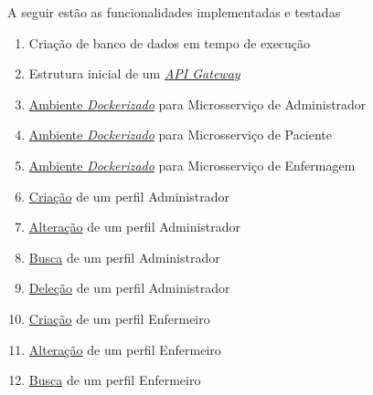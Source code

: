 \begin{apendicesenv}
A seguir estão as funcionalidades implementadas e testadas

\begin{enumerate}
    \item Criação de banco de dados em tempo de execução
    \item Estrutura inicial de um \href{https://github.com/PillWatcher/pillwatcher-api-gateway}{\emph{API Gateway}}
    \item \href{https://github.com/PillWatcher/pillwatcher-dpb-admin-service/blob/master/Dockerfile}{Ambiente \emph{Dockerizado}} para Microsserviço de Administrador
    \item \href{https://github.com/PillWatcher/pillwatcher-dpb-patient-service/blob/master/Dockerfile}{Ambiente \emph{Dockerizado}} para Microsserviço de Paciente
    \item \href{https://github.com/PillWatcher/pillwatcher-dpb-nursing-service/blob/master/Dockerfile}{Ambiente \emph{Dockerizado}} para Microsserviço de Enfermagem
    \item \href{https://github.com/PillWatcher/pillwatcher-dpb-admin-service/blob/master/src/main/java/br/com/pillwatcher/dpb/services/impl/AdminServiceImpl.java#L32}{Criação} de um perfil Administrador
    \item \href{https://github.com/PillWatcher/pillwatcher-dpb-admin-service/blob/master/src/main/java/br/com/pillwatcher/dpb/services/impl/AdminServiceImpl.java#L50}{Alteração} de um perfil Administrador
    \item \href{https://github.com/PillWatcher/pillwatcher-dpb-admin-service/blob/master/src/main/java/br/com/pillwatcher/dpb/services/impl/AdminServiceImpl.java#L79}{Busca} de um perfil Administrador
    \item \href{https://github.com/PillWatcher/pillwatcher-dpb-admin-service/blob/master/src/main/java/br/com/pillwatcher/dpb/services/impl/AdminServiceImpl.java#L96}{Deleção} de um perfil Administrador
    \item \href{https://github.com/PillWatcher/pillwatcher-dpb-nursing-service/blob/master/src/main/java/br/com/pillwatcher/dpb/services/impl/NurseServiceImpl.java#L29}{Criação} de um perfil Enfermeiro
    \item \href{https://github.com/PillWatcher/pillwatcher-dpb-nursing-service/blob/master/src/main/java/br/com/pillwatcher/dpb/services/impl/NurseServiceImpl.java#L71}{Alteração} de um perfil Enfermeiro
    \item \href{https://github.com/PillWatcher/pillwatcher-dpb-nursing-service/blob/master/src/main/java/br/com/pillwatcher/dpb/services/impl/NurseServiceImpl.java#L55}{Busca} de um perfil Enfermeiro

\end{enumerate}
\end{apendicesenv}
